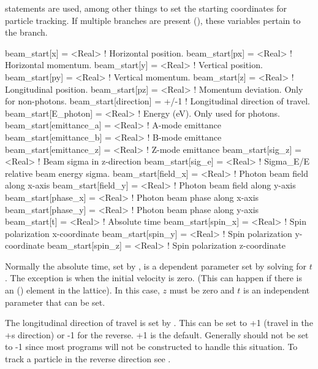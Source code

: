  statements are used, among other things to set the starting coordinates
for particle tracking. If multiple branches are present (), these
variables pertain to the  branch.
\begin{example}
  beam_start[x]                   = <Real>   ! Horizontal position.
  beam_start[px]                  = <Real>   ! Horizontal momentum.
  beam_start[y]                   = <Real>   ! Vertical position.
  beam_start[py]                  = <Real>   ! Vertical momentum.
  beam_start[z]                   = <Real>   ! Longitudinal position.
  beam_start[pz]                  = <Real>   ! Momentum deviation. Only for non-photons.
  beam_start[direction]           = +/-1     ! Longitudinal direction of travel.
  beam_start[E_photon]            = <Real>   ! Energy (eV). Only used for photons.
  beam_start[emittance_a]         = <Real>   ! A-mode emittance
  beam_start[emittance_b]         = <Real>   ! B-mode emittance
  beam_start[emittance_z]         = <Real>   ! Z-mode emittance
  beam_start[sig_z]               = <Real>   ! Beam sigma in z-direction
  beam_start[sig_e]               = <Real>   ! Sigma_E/E relative beam energy sigma.
  beam_start[field_x]             = <Real>   ! Photon beam field along x-axis
  beam_start[field_y]             = <Real>   ! Photon beam field along y-axis
  beam_start[phase_x]             = <Real>   ! Photon beam phase along x-axis
  beam_start[phase_y]             = <Real>   ! Photon beam phase along y-axis
  beam_start[t]                   = <Real>   ! Absolute time
  beam_start[spin_x]              = <Real>   ! Spin polarization x-coordinate
  beam_start[spin_y]              = <Real>   ! Spin polarization y-coordinate
  beam_start[spin_z]              = <Real>   ! Spin polarization z-coordinate
\end{example}
Normally the absolute time, set by , is a dependent
parameter set by solving  for $t$. The exception is when the
initial velocity is zero. (This can happen if there is an 
() element in the lattice). In this case, $z$ must be
zero and $t$ is an independent parameter that can be set.

The longitudinal direction of travel is set by .  This can be set
to +1 (travel in the +s direction) or -1 for the reverse.  +1 is the default. Generally
 should not be set to -1 since most programs will not be
constructed to handle this situation. To track a particle in the reverse direction see
. 

